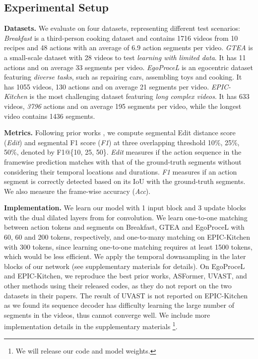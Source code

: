 \documentclass[10pt,twocolumn,letterpaper]{article}
\newcommand{\headline}[1]{\noindent \textbf{#1}}
\newcommand{\0}{\boldsymbol{0}}
\begin{document}
\subsection{Experimental Setup}
\headline{Datasets.} We evaluate on four datasets, representing different test scenarios: 
\textit{Breakfast} \cite{Serre:CVPR14} is a third-person cooking dataset and contains 1716 videos from 10 recipes and 48 actions with an average of 6.9 action segments per video.
\textit{GTEA} \cite{Fathi:CVPR21} is a small-scale dataset with 28 videos to test \textit{learning with limited data}. It has 11 actions and on average 33 segments per video.
\textit{EgoProceL} \cite{Bansal:ECCV2022} is an egocentric dataset featuring \textit{diverse tasks}, such as repairing cars, assembling toys and cooking. 
It has 1055 videos, 130 actions and on average 21 segments per video.
\textit{EPIC-Kitchen} \cite{Damen:IJCV22} is the most challenging dataset featuring \textit{long complex videos}. It has 633 videos, \textit{3796} actions and on average 195 segments per video, while the longest video contains 1436 segments. 

\headline{Metrics.}
Following prior works \cite{Farha:CVPR19,Li:TPAMI20,Yi:BMVC21,Dipika:Arxiv21,Behrmann:ECCV22}, we compute segmental Edit distance score (\textit{Edit}) and segmental F1 score (\textit{F1}) at three overlapping threshold 10\%, 25\%, 50\%, denoted by F1@\{10, 25, 50\}. 
\textit{Edit} measures if the action sequence in the framewise prediction matches with that of the ground-truth segments without considering their temporal locations and durations. 
\textit{F1} measures if an action segment is correctly detected based on its IoU with the ground-truth segments. 
We also measure the frame-wise accuracy (\textit{Acc}).

\headline{Implementation.}
We learn our model with 1 input block and 3 update blocks with the dual dilated layers from \cite{Li:TPAMI20} for convolution.
We learn one-to-one matching between action tokens and segments on Breakfast, GTEA and EgoProceL with 60, 60 and 200 tokens, respectively, and one-to-many matching on EPIC-Kitchen with 300 tokens, since learning one-to-one matching requires at least 1500 tokens, which would be less efficient. We apply the temporal downsampling in the later blocks of our network (see supplementary materials for details). 
On EgoProceL and EPIC-Kitchen, we reproduce the best prior works, ASFormer, UVAST, and other methods \cite{Farha:CVPR19,Li:TPAMI20,Ishikawa:WACV21} using their released codes, as they do not report on the two datasets in their papers.
The result of UVAST is not reported on EPIC-Kitchen as we found its sequence decoder has difficulty learning the large number of segments in the videos, thus cannot converge well.
We include more implementation details in the supplementary materials \footnote{We will release our code and model weights.}.
\end{document}

